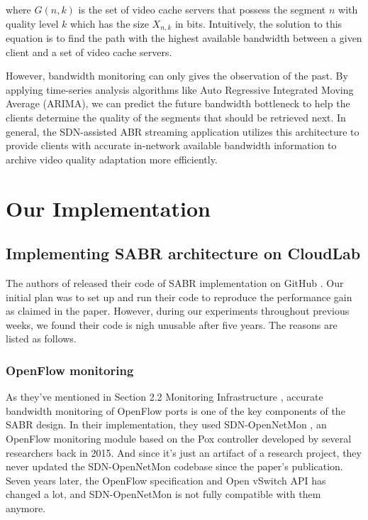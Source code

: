 \documentclass[12pt]{article}
\begin{document}
where $G(n,k)$ is the set of video cache servers that possess the segment $n$ with quality level $k$ which has the size $X_{n,k}$ in bits. Intuitively, the solution to this equation is to find the path with the highest available bandwidth between a given client and a set of video cache servers. 

However, bandwidth monitoring can only gives the observation of the past. By applying time-series analysis algorithms like Auto Regressive Integrated Moving Average (ARIMA), we can predict the future bandwidth bottleneck to help the clients determine the quality of the segments that should be retrieved next. In general, the SDN-assisted ABR streaming application utilizes this architecture to provide clients with accurate in-network available bandwidth information to archive video quality adaptation more efficiently.



\section{Our Implementation}
\subsection{Implementing SABR architecture on CloudLab}

The authors of \cite{bhat_network_2017} released their code of SABR implementation on GitHub \cite{sabr_code}. Our initial plan was to set up and run their code to reproduce the performance gain as claimed in the paper. However, during our experiments throughout previous weeks, we found their code is nigh unusable after five years. The reasons are listed as follows.

\subsubsection{OpenFlow monitoring}
As they've mentioned in Section 2.2 Monitoring Infrastructure \cite{bhat_network_2017}, accurate bandwidth monitoring of OpenFlow ports is one of the key components of the SABR design. In their implementation, they used SDN-OpenNetMon \cite{openmon}, an OpenFlow monitoring module based on the Pox controller developed by several researchers back in 2015. And since it's just an artifact of a research project, they never updated the SDN-OpenNetMon codebase since the paper's publication. Seven years later, the OpenFlow specification and Open vSwitch API has changed a lot, and SDN-OpenNetMon is not fully compatible with them anymore. 
\end{document}
